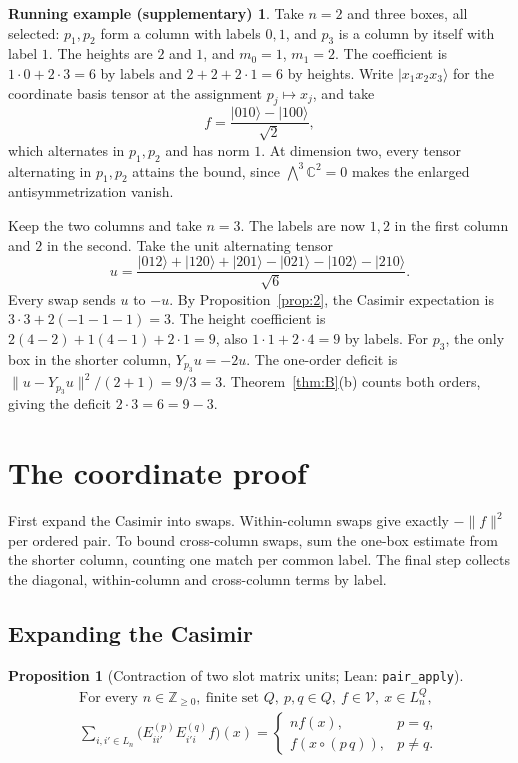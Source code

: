 \documentclass[11pt]{amsart}
\newcommand{\lean}[1]{\texttt{#1}}
\newcommand{\notlean}{supplementary}
\newtheorem{proposition}{Proposition}
\theoremstyle{definition}
\newtheorem*{example}{Running example \textup{(\notlean)}}
\theoremstyle{remark}
\begin{document}
\begin{example}
Take \(n=2\) and three boxes, all selected: \(p_1,p_2\) form a column with
labels \(0,1\), and \(p_3\) is a column by itself with label \(1\). The
heights are \(2\) and \(1\), and \(m_0=1\), \(m_1=2\). The coefficient is
\(1\cdot 0+2\cdot 3=6\) by labels and \(2+2+2\cdot 1=6\) by heights. Write
\(\lvert x_1x_2x_3\rangle\) for the coordinate basis tensor at the assignment
\(p_j\mapsto x_j\), and take
\[
f=\frac{\lvert010\rangle-\lvert100\rangle}{\sqrt2},
\]
which alternates in \(p_1,p_2\) and has norm \(1\). At dimension two,
every tensor alternating in \(p_1,p_2\) attains the bound, since
\(\bigwedge^3\mathbb C^2=0\) makes the enlarged antisymmetrization vanish.

Keep the two columns and take \(n=3\). The labels are now \(1,2\) in the
first column and \(2\) in the second. Take the unit alternating tensor
\[
u=\frac{\lvert012\rangle+\lvert120\rangle+\lvert201\rangle
-\lvert021\rangle-\lvert102\rangle-\lvert210\rangle}{\sqrt6}.
\]
Every swap sends \(u\) to \(-u\). By Proposition~\ref{prop:2}, the
Casimir expectation is \(3\cdot3+2(-1-1-1)=3\). The height coefficient
is \(2(4-2)+1(4-1)+2\cdot1=9\), also \(1\cdot1+2\cdot4=9\) by labels.
For \(p_3\), the only box in the shorter column, \(Y_{p_3}u=-2u\).
The one-order deficit is \(\|u-Y_{p_3}u\|^2/(2+1)=9/3=3\).
Theorem~\ref{thm:B}(b) counts both orders, giving the deficit \(2\cdot3=6=9-3\).
\end{example}


\section{The coordinate proof}\label{sec:proof}

First expand the Casimir into swaps. Within-column swaps give exactly
\(-\|f\|^2\) per ordered pair. To bound cross-column swaps, sum the
one-box estimate from the shorter column, counting one match per common
label. The final step collects the diagonal, within-column and
cross-column terms by label.

\subsection{Expanding the Casimir}

\begin{proposition}[Contraction of two slot matrix units; Lean: \lean{pair\_\allowbreak{}apply}]\label{prop:1}
\[
\begin{gathered}
\text{For every }n\in\mathbb Z_{\ge0},\ \text{finite set }Q,\
p,q\in Q,\ f\in\mathcal V,\ x\in L_n^Q,\\
\sum_{i,i'\in L_n}\bigl(E^{(p)}_{ii'}E^{(q)}_{i'i}f\bigr)(x)
=
\begin{cases}
n f(x),&p=q,\\
f(x\circ(p\,q)),&p\ne q .
\end{cases}
\end{gathered}
\]
\end{proposition}
\end{document}
